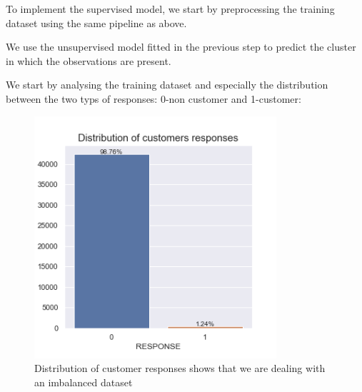 To implement the supervised model, we start by preprocessing the training dataset using the same pipeline as above.

We use the unsupervised model fitted in the previous step to predict the cluster in which the observations are present.

We start by analysing the training dataset and especially the distribution between the two typs of responses: 0-non customer and 1-customer:

\begin{figure}[h]
\centering
\includegraphics[width=0.8\textwidth]{images/customers_dist.png}
\caption{Distribution of customer responses shows that we are dealing with an imbalanced dataset}
\label{fig:cust_dist}
\end{figure}

